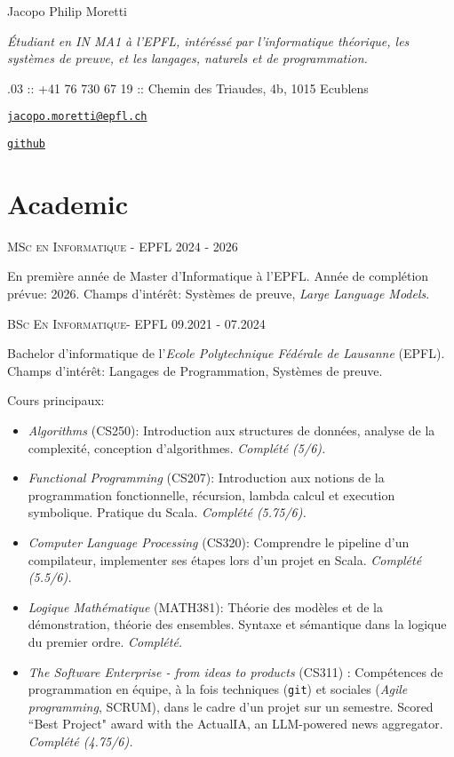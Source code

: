 \documentclass[11pt]{article}
\renewcommand{\url}[1]{{\texttt{#1}}}
\renewcommand{\line}[2]{{\vspace{4pt} \large \noindent\textsc{#1} \hfill #2}\vspace{4pt}}
\begin{document}
  \begin{center}
    \huge Jacopo Philip Moretti
  \end{center}

  \begin{adjustwidth}{1in}{1in}
    \textit{Étudiant en IN MA1 à l'EPFL, intéréssé par l'informatique théorique, les systèmes de preuve, et les langages, naturels et de programmation.}

    .03 :: +41 76 730 67 19 :: Chemin des Triaudes, 4b, 1015 Ecublens
    
    \noindent \href{https://people.epfl.ch/jacopo.moretti}{\url{jacopo.moretti@epfl.ch}}
    
    \noindent \href{https://github.com/quartztz}{\url{github}}
  \end{adjustwidth}

  \section*{Academic}

  \line{MSc en Informatique - EPFL}{2024 - 2026}

  En première année de Master d'Informatique à l'EPFL. Année de complétion prévue: 2026. Champs d'intérêt: Systèmes de preuve, \textit{Large Language Models}.  
  \vspace{1em}

  \line{BSc En Informatique- EPFL}{09.2021 - 07.2024}

  Bachelor d'informatique de l'\textit{Ecole Polytechnique Fédérale de Lausanne} (EPFL). Champs d'intérêt: Langages de Programmation, Systèmes de preuve. 

  Cours principaux:
  \begin{itemize}
    \item \textit{Algorithms} (CS250): Introduction aux structures de données, analyse de la complexité, conception d'algorithmes. \textit{Complété (5/6).}
    \item \textit{Functional Programming} (CS207): Introduction aux notions de la programmation fonctionnelle, récursion, lambda calcul et execution symbolique. Pratique du Scala. \textit{Complété (5.75/6).}
    \item \textit{Computer Language Processing} (CS320): Comprendre le pipeline d'un compilateur, implementer ses étapes lors d'un projet en Scala. \textit{Complété (5.5/6).}
    \item \textit{Logique Mathématique} (MATH381): Théorie des modèles et de la démonstration, théorie des ensembles. Syntaxe et sémantique dans la logique du premier ordre. \textit{Complété.}
    \item \textit{The Software Enterprise - from ideas to products} (CS311) : Compétences de programmation en équipe, à la fois techniques (\texttt{git}) et sociales (\textit{Agile programming}, SCRUM), dans le cadre d'un projet sur un semestre. Scored ``Best Project" award with the ActualIA, an LLM-powered news aggregator. \textit{Complété (4.75/6).}

  \end{itemize}
\end{document}
